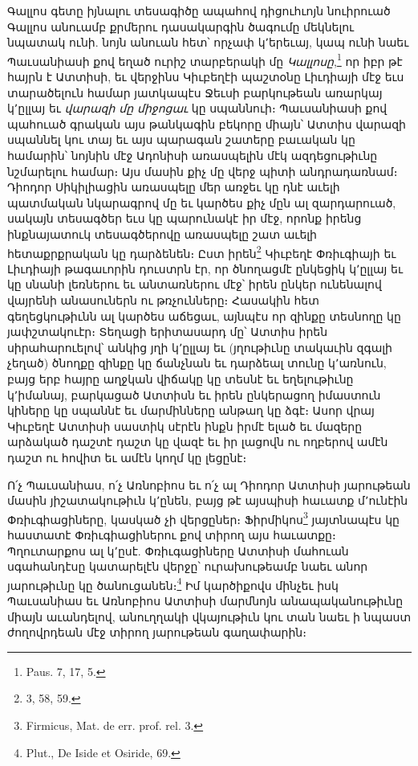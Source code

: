 \documentclass{article}
\begin{document}
{Գալլոս գետը իյնալու տեսագիծը ապահով դիցուհւոյն նուիրուած Գալլոս անուամբ քրմերու դասակարգին ծագումը մեկնելու նպատակ ունի. նոյն անուան հետ՝ որչափ կ՚երեւայ, կապ ունի նաեւ Պաւսանիասի քով եղած ուրիշ տարբերակի մը \emph{Կալլոսը},\footnote{Paus. 7, 17, 5.} որ իբր թէ հայրն է Ատտիսի, եւ վերջինս Կիւբեղէի պաշտօնը Լիւդիայի մէջ եւս տարածելուն համար յատկապէս Ջեւսի բարկութեան առարկայ կ՚ըլլայ եւ \emph{վարազի մը միջոցաւ} կը սպաննուի։ Պաւսանիասի քով պահուած գրական այս թանկագին բեկորը միայն՝ Ատտիս վարազի սպաննել կու տայ եւ այս պարագան շատերը բաւական կը համարին՝ նոյնին մէջ Ադոնիսի առասպելին մէկ ազդեցութիւնը նշմարելու համար։ Այս մասին քիչ մը վերջ պիտի անդրադառնամ։ Դիոդոր Սիկիլիացին առասպելը մեր առջեւ կը դնէ աւելի պատմական նկարագրով մը եւ կարծես քիչ մըն ալ զարդարուած, սակայն տեսագծեր եւս կը պարունակէ իր մէջ, որոնք իրենց ինքնայատուկ տեսագծերովը առասպելը շատ աւելի հետաքրքրական կը դարձենեն։ Ըստ իրեն\footnote{3, 58, 59.} Կիւբեղէ Փռիւգիայի եւ Լիւդիայի թագաւորին դուստրն էր, որ ծնողացմէ ընկեցիկ կ՚ըլլայ եւ կը սնանի լեռներու եւ անտառներու մէջ՝ իրեն ընկեր ունենալով վայրենի անասուներն ու թռչունները։ Հասակին հետ գեղեցկութիւնն ալ կարծես աճեցաւ, այնպէս որ զինքը տեսնողը կը յափշտակուէր։ Տեղացի երիտասարդ մը՝ Ատտիս իրեն սիրահարուելով՝ անկից յղի կ՚ըլլայ եւ (յղութիւնը տակաւին զգալի չեղած) ծնողքը զինքը կը ճանչնան եւ դարձեալ տունը կ՚առնուն, բայց երբ հայրը աղջկան վիճակը կը տեսնէ եւ եղելութիւնը կ՚իմանայ, բարկացած Ատտիսն եւ իրեն ընկերացող իմաստուն կիները կը սպաննէ եւ մարմինները անթաղ կը ձգէ։ Ասոր վրայ Կիւբեղէ Ատտիսի սաստիկ սէրէն ինքն իրմէ ելած եւ մազերը արձակած դաշտէ դաշտ կը վազէ եւ իր լացովն ու ողբերով ամէն դաշտ ու հովիտ եւ ամէն կողմ կը լեցընէ։

Ո՛չ Պաւսանիաս, ո՛չ Առնոբիոս եւ ո՛չ ալ Դիոդոր Ատտիսի յարութեան մասին յիշատակութիւն կ՚ընեն, բայց թէ այսպիսի հաւատք մ՚ունէին Փռիւգիացիները, կասկած չի վերցըներ։ Ֆիրմիկոս\footnote{Firmicus, Mat. de err. prof. rel. 3.} յայտնապէս կը հաստատէ Փռիւգիացիներու քով տիրող այս հաւատքը։ Պղուտարքոս ալ կ՚ըսէ. Փռիւգացիները Ատտիսի մահուան սգահանդէսը կատարելէն վերջը՝ ուրախութեամբ նաեւ անոր յարութիւնը կը ծանուցանեն։\footnote{Plut., De Iside et Osiride, 69.} Իմ կարծիքովս մինչեւ իսկ Պաւսանիաս եւ Առնոբիոս Ատտիսի մարմնոյն անապականութիւնը միայն աւանդելով, անուղղակի վկայութիւն կու տան նաեւ ի նպաստ ժողովրդեան մէջ տիրող յարութեան գաղափարին։

}
\end{document}
